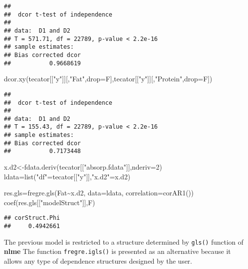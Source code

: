 \documentclass[
]{book}
\newenvironment{Shaded}{\begin{snugshade}}{\end{snugshade}}
\newcommand{\AttributeTok}[1]{\textcolor[rgb]{0.77,0.63,0.00}{#1}}
\newcommand{\DecValTok}[1]{\textcolor[rgb]{0.00,0.00,0.81}{#1}}
\newcommand{\FunctionTok}[1]{\textcolor[rgb]{0.00,0.00,0.00}{#1}}
\newcommand{\NormalTok}[1]{#1}
\newcommand{\OtherTok}[1]{\textcolor[rgb]{0.56,0.35,0.01}{#1}}
\newcommand{\SpecialCharTok}[1]{\textcolor[rgb]{0.00,0.00,0.00}{#1}}
\newcommand{\StringTok}[1]{\textcolor[rgb]{0.31,0.60,0.02}{#1}}
\begin{document}
\begin{verbatim}
## 
##  dcor t-test of independence
## 
## data:  D1 and D2
## T = 571.71, df = 22789, p-value < 2.2e-16
## sample estimates:
## Bias corrected dcor 
##           0.9668619
\end{verbatim}

\begin{Shaded}
\begin{Highlighting}[]
\FunctionTok{dcor.xy}\NormalTok{(tecator[[}\StringTok{"y"}\NormalTok{]][,}\StringTok{"Fat"}\NormalTok{,}\AttributeTok{drop=}\NormalTok{F],tecator[[}\StringTok{"y"}\NormalTok{]][,}\StringTok{"Protein"}\NormalTok{,}\AttributeTok{drop=}\NormalTok{F])}
\end{Highlighting}
\end{Shaded}

\begin{verbatim}
## 
##  dcor t-test of independence
## 
## data:  D1 and D2
## T = 155.43, df = 22789, p-value < 2.2e-16
## sample estimates:
## Bias corrected dcor 
##           0.7173448
\end{verbatim}

\begin{Shaded}
\begin{Highlighting}[]
\NormalTok{x.d2}\OtherTok{\textless{}{-}}\FunctionTok{fdata.deriv}\NormalTok{(tecator[[}\StringTok{"absorp.fdata"}\NormalTok{]],}\AttributeTok{nderiv=}\DecValTok{2}\NormalTok{)}
\NormalTok{ldata}\OtherTok{=}\FunctionTok{list}\NormalTok{(}\StringTok{"df"}\OtherTok{=}\NormalTok{tecator[[}\StringTok{"y"}\NormalTok{]],}\StringTok{"x.d2"}\OtherTok{=}\NormalTok{x.d2)}

\NormalTok{res.gls}\OtherTok{=}\FunctionTok{fregre.gls}\NormalTok{(Fat}\SpecialCharTok{\textasciitilde{}}\NormalTok{x.d2, }\AttributeTok{data=}\NormalTok{ldata, }\AttributeTok{correlation=}\FunctionTok{corAR1}\NormalTok{())}
\FunctionTok{coef}\NormalTok{(res.gls[[}\StringTok{"modelStruct"}\NormalTok{]],F)}
\end{Highlighting}
\end{Shaded}

\begin{verbatim}
## corStruct.Phi 
##     0.4942661
\end{verbatim}

The previous model is restricted to a structure determined by \texttt{gls()} function of \textbf{nlme} The function \texttt{fregre.igls()} is presented as an alternative because it allows any type of dependence structures designed by the user.
\end{document}
